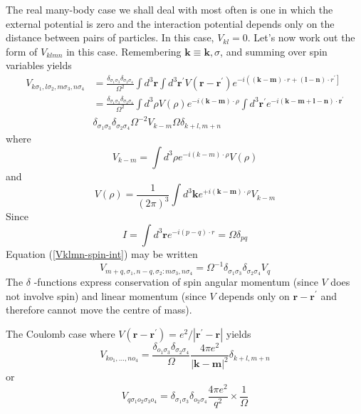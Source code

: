 The real many-body case we shall deal with most often is one in which the external potential is zero and the interaction potential depends only on the distance between pairs of particles. In this case, $V_{kl}=0$. Let's now work out the form of $V_{klmn}$ in this case. Remembering $\mathbf{k}\equiv\mathbf{k},\sigma$, and summing over spin variables yields
\begin{equation}\begin{aligned}
V_{k \sigma_{1}, l \sigma_{2}, m \sigma_{3}, n \sigma_{4}} &=\frac{\delta_{\sigma_{1}\sigma_3}  \delta_{\sigma_{2} \sigma_{4}}}{\Omega^{2}} \int d^{3} \mathbf{r} \int d^{3} \mathbf{r}^{\prime} V\left(\mathbf{r}-\mathbf{r}^{\prime}\right) e^{-i\left((\mathbf{k}-\mathbf{m}) \cdot r+(\mathbf{l}-\mathbf{n}) \cdot r^{\prime}\right]} \\
&=\frac{\delta_{\sigma_{1} \sigma_{3}} \delta_{\sigma_{2} \sigma_{4}}}{\Omega^{2}} \int d^{3} \rho V(\rho) e^{-i(\mathbf{k}-\mathbf{m}) \cdot \rho} \int d^{3} \mathbf{r}^{\prime} e^{-i(\mathbf{k}-\mathbf{m}+\mathbf{l}-\mathbf{n}) \cdot \mathbf{r}^{\prime}}\\
&\delta_{\sigma_{1} \sigma_{3}} \delta_{\sigma_{2} \sigma_{4}} \Omega^{-2} V_{k-m} \Omega \delta_{k+l, m+n}
\end{aligned}
\label{Vklmn-spin-int}
\end{equation}
where
\begin{equation}V_{k-m}=\int d^{3} \rho e^{-i(k-m) \cdot \rho} V(\rho)\end{equation}
and
\begin{equation}V(\rho)=\frac{1}{(2 \pi)^{3}} \int d^{3} \mathbf{k} e^{+i(\mathbf{k}-\mathbf{m}) \cdot \rho} V_{k-m}\end{equation}
Since
$$I=\int d^{3} \mathbf{r} e^{-i(p-q) \cdot r}=\Omega \delta_{p q}$$
Equation (\ref{Vklmn-spin-int}) may be written
$$V_{m+q, \sigma_{1}, n-q, \sigma_{2}: m \sigma_{3}, n \sigma_{4}}=\Omega^{-1} \delta_{\sigma_{1} \sigma_{3}} \delta_{\sigma_{2} \sigma_{4}} V_{q}$$
The $\delta$ -functions express conservation of spin angular momentum (since $V$ does not involve spin) and linear momentum (since $V$ depends only on $\mathbf{r}-\mathbf{r}^{\prime}$ and therefore cannot move the centre of mass). 
\begin{mybox}
The Coulomb case where $V\left(\mathbf{r}-\mathbf{r}^{\prime}\right)=e^{2} /\left|\mathbf{r}^{\prime}-\mathbf{r}\right|$ yields
$$V_{k o_{1}, \ldots, n o_{4}}=\frac{\delta_{o_{1} \sigma_{3}} \delta_{\sigma_{2} \sigma_{4}}}{\Omega} \frac{4 \pi e^{2}}{|\mathbf{k}-\mathbf{m}|^{2}} \delta_{k+l, m+n}$$
or
$$V_{q \sigma_{1} o_{2} \sigma_{3} o_{4}}=\delta_{\sigma_{1} \sigma_{3}} \delta_{o_{2} \sigma_{4}} \frac{4 \pi e^{2}}{q^{2}} \times \frac{1}{\Omega}$$
\end{mybox}

